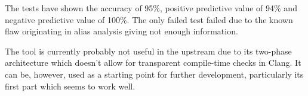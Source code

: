The tests have shown the accuracy of 95\%, positive predictive value of 94\% and negative predictive value of 100\%. The only failed test failed due to the known flaw  originating in alias analysis giving not enough information.

The tool is currently probably not useful in the upstream due to its two-phase architecture which doesn't allow for transparent compile-time checks in Clang. It can be, however, used as a starting point for further development, particularly its first part which seems to work well.

